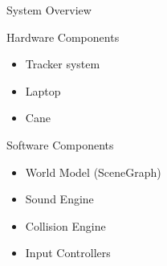 \documentclass{beamer}
\begin{document}
\begin{frame}{System Overview}

\begin{block}{Hardware Components}
\begin{itemize}
  \item Tracker system
  \item Laptop
  \item Cane
\end{itemize}
\end{block}

\begin{block}{Software Components}
\begin{itemize}
  \item World Model (SceneGraph)
  \item Sound Engine
  \item Collision Engine
  \item Input Controllers
\end{itemize}
\end{block}

\end{frame}
\end{document}
